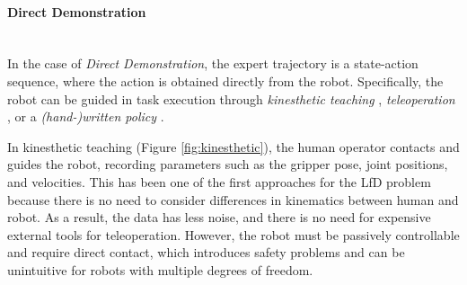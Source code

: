 \paragraph*{Direct Demonstration}  \mbox{} \\
In the case of \textit{Direct Demonstration}, the expert trajectory is a state-action sequence, where the action is obtained directly from the robot. Specifically, the robot can be guided in task execution through \textit{kinesthetic teaching} \cite{caccavale2019kinesthetic,johns2021coarse_to_fine}, \textit{teleoperation} \cite{zhang2018deep_vr_teleoperation,mandlekar2018roboturk,jang2022bc_z,brohan2022rt,ebert22Bridge,mandlekar2023mimicgen}, or a \textit{(hand-)written policy} \cite{dasari2020robonet,dasari2021transformers_one_shot,mandi2022towards_more_generalizable_one_shot,chang2023one}.

In kinesthetic teaching (Figure \ref{fig:kinesthetic}), the human operator contacts and guides the robot, recording parameters such as the gripper pose, joint positions, and velocities. This has been one of the first approaches for the LfD problem \cite{lee2011incremental,saveriano2015incremental} because there is no need to consider differences in kinematics between human and robot. As a result, the data has less noise, and there is no need for expensive external tools for teleoperation. However, the robot must be passively controllable and require direct contact, which introduces safety problems and can be unintuitive for robots with multiple degrees of freedom.

